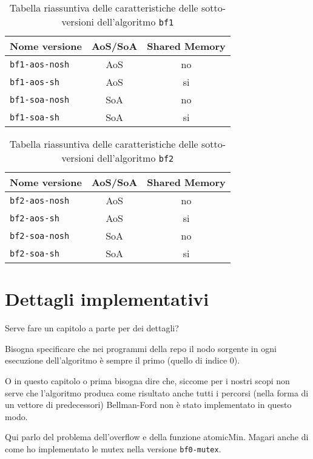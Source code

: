 \documentclass[a4paper]{article}
\begin{document}
	\begin{table}[!ht]
		\centering
		\begin{tabular}{|l|c|c|}
			\hline
			\textbf{Nome versione} & \textbf{AoS/SoA} & \textbf{Shared Memory} \\ \hline
			\texttt{bf1-aos-nosh}  & AoS & no \\ \hline
			\texttt{bf1-aos-sh}    & AoS & si \\ \hline
			\texttt{bf1-soa-nosh}  & SoA & no \\ \hline
			\texttt{bf1-soa-sh}    & SoA & si \\ \hline
		\end{tabular}
		\label{tab:riassunto_bf1}
		\caption{Tabella riassuntiva delle caratteristiche delle sotto-versioni dell'algoritmo \texttt{bf1}}
	\end{table}

	\begin{table}[!ht]
		\centering
		\begin{tabular}{|l|c|c|}
			\hline
			\textbf{Nome versione} & \textbf{AoS/SoA} & \textbf{Shared Memory} \\ \hline
			\texttt{bf2-aos-nosh}  & AoS & no \\ \hline
			\texttt{bf2-aos-sh}    & AoS & si \\ \hline
			\texttt{bf2-soa-nosh}  & SoA & no \\ \hline
			\texttt{bf2-soa-sh}    & SoA & si \\ \hline
		\end{tabular}
		\label{tab:riassunto_bf2}
		\caption{Tabella riassuntiva delle caratteristiche delle sotto-versioni dell'algoritmo \texttt{bf2}}
	\end{table}
	
	\section{Dettagli implementativi}
	\label{section:impl}
	Serve fare un capitolo a parte per dei dettagli?
	
	Bisogna specificare che nei programmi della repo il nodo sorgente in ogni esecuzione dell'algoritmo è sempre il primo (quello di indice 0).
	
	O in questo capitolo o prima bisogna dire che, siccome per i nostri scopi non serve che l'algoritmo produca come risultato anche tutti i percorsi (nella forma di un vettore di predecessori) Bellman-Ford non è stato implementato in questo modo.
	
	Qui parlo del problema dell'overflow e della funzione atomicMin. Magari anche di come ho implementato le mutex nella versione \texttt{bf0-mutex}.
	
\end{document}
